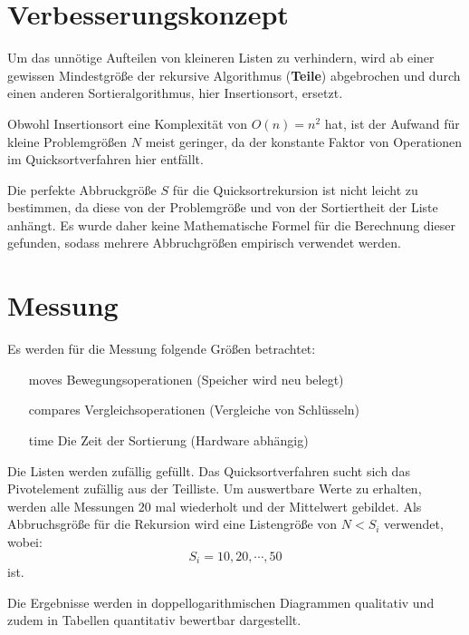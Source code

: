 \documentclass[
   draft=false
  ,paper=a4
  ,twoside=false
  ,fontsize=11pt
  ,headsepline
  ,DIV=11
  ,parskip=full+
  ,titlepage
]{scrartcl} %
\begin{document}
\section{Verbesserungskonzept}

Um das unnötige Aufteilen von kleineren Listen zu verhindern, 
wird ab einer gewissen Mindestgröße der rekursive
Algorithmus (\textbf{Teile}) abgebrochen und durch einen anderen
Sortieralgorithmus, hier Insertionsort, ersetzt. \citep{ADskript}

Obwohl Insertionsort eine Komplexität von $O(n)=n^2$ hat, ist der Aufwand für 
kleine Problemgrößen $N$ meist geringer, 
da der konstante Faktor von Operationen im Quicksortverfahren hier entfällt. 

Die perfekte Abbruckgröße $S$ für die Quicksortrekursion ist nicht leicht zu
bestimmen, da diese von der Problemgröße und von der Sortiertheit der Liste 
anhängt. Es wurde daher keine Mathematische Formel für die Berechnung dieser
gefunden, sodass mehrere Abbruchgrößen empirisch verwendet werden. 

\section{Messung}

Es werden für die Messung folgende Größen betrachtet:
\begin{itemize}
  \item[moves] Bewegungsoperationen (Speicher wird neu belegt)
  \item[compares] Vergleichsoperationen (Vergleiche von Schlüsseln)
  \item[time] Die Zeit der Sortierung (Hardware abhängig)
\end{itemize}


Die Listen werden zufällig gefüllt. Das Quicksortverfahren sucht sich 
das Pivotelement zufällig aus der Teilliste. 
Um auswertbare Werte zu erhalten, werden alle Messungen $20$ mal wiederholt
und der Mittelwert gebildet. 
Als Abbruchsgröße für die Rekursion wird eine Listengröße von $N < S_i$ 
verwendet, wobei: 
\[
S_i= 10,20,\cdots,50
\]
ist.

Die Ergebnisse werden in doppellogarithmischen Diagrammen qualitativ und 
zudem in Tabellen quantitativ bewertbar dargestellt.
\end{document}
